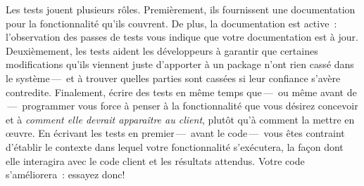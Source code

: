 \documentclass[a4paper,10pt,twoside]{book}
\begin{document}

Les tests jouent plusieurs rôles. Premièrement, ils fournissent une
documentation pour la fonctionnalité qu'ils couvrent. De plus, la
documentation est active~: l'observation des passes de tests vous
indique que votre documentation est à jour. Deuxièmement, les tests
aident les développeurs à garantir que certaines modifications qu'ils
viennent juste d'apporter à un package n'ont rien cassé dans le
système\,---\, et à trouver quelles parties sont cassées si leur
confiance s'avère contredite. Finalement, écrire des tests en même
temps que\,---\, ou même avant de \,---\,  programmer vous force à
penser à la fonctionnalité que vous désirez concevoir et à
\emph{comment elle devrait apparaître au client}, plutôt qu'à comment
la mettre en {\oe}uvre. En écrivant les tests en premier\,---\, avant
le code\,---\, vous êtes contraint d'établir le contexte dans lequel
votre fonctionnalité s'exécutera, la façon dont elle interagira avec
le code client et les résultats attendus. Votre code s'améliorera~:
essayez donc!
 
\end{document}
